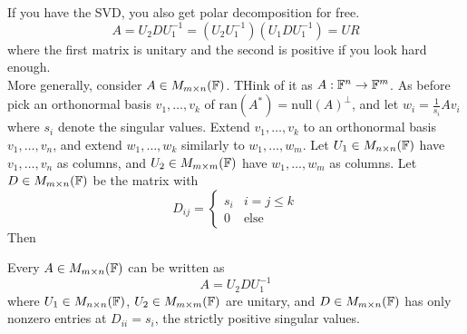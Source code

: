 \documentclass[12pt]{article}
\begin{document}
If you have the SVD, you also get polar decomposition for free.
$$A = U_2DU_1^{-1} = (U_2U_1^{-1})(U_1DU_1^{-1}) = UR$$
where the first matrix is unitary and the second is positive if you look hard enough. \\
More generally, consider $A \in M_{m \times n}(\mathbb{F})$. THink of it as $A: \mathbb{F}^n \rightarrow \mathbb{F}^m$. As before pick an orthonormal basis $v_1,\dots,v_k$ of $\text{ran}(A^*) = \text{null}(A)^\perp$, and let $w_i = \frac{1}{s_i}Av_i$ where $s_i$ denote the singular values. Extend $v_1,\dots,v_k$ to an orthonormal basis $v_1,\dots,v_n$, and extend $w_1,\dots,w_k$ similarly to $w_1,\dots,w_m$. Let $U_1 \in M_{n \times n}(\mathbb{F})$ have $v_1,\dots,v_n$ as columns, and $U_2 \in M_{m \times m}(\mathbb{F})$ have $w_1,\dots,w_m$ as columns. Let $D \in M_{m \times n}(\mathbb{F})$ be the matrix with
$$D_{ij} = \begin{cases} s_i & i = j \leq k \\ 0 & \text{else} \end{cases}$$
Then

\begin{thm}
	Every $A \in M_{m \times n}(\mathbb{F})$ can be written as
	$$A = U_2DU_1^{-1}$$
	where $U_1 \in M_{n \times n}(\mathbb{F})$, $U_2 \in M_{m \times m}(\mathbb{F})$ are unitary, and $D \in M_{m \times n}(\mathbb{F})$ has only nonzero entries at $D_{ii} = s_i$, the strictly positive singular values.
\end{thm}
\end{document}
